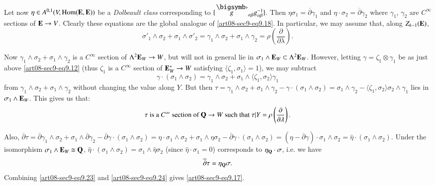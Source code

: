 Let now $\eta\in A^{0,1}(V,\operatorname{\mathrm{Hom}}(\mathbf{E},\mathbf{E}))$ be a {\em Dolbeault class} corresponding to $\{\overdot{g}_{\alpha\beta}g^{-1}_{\alpha\beta}\}$. Then $\eta\sigma_{1}=\overline{\partial}\gamma_{1}$ and $\eta\cdot \sigma_{2}=\overline{\partial}\gamma_{2}$ where $\gamma_{1}$, $\gamma_{2}$ are $C^{\infty}$ sections of $\mathbf{E}\to V$. Clearly these equations are the global analogue of \eqref{art08-sec9-eq9.18}. In particular, we may assume that, along $Z_{k-1}(\mathbf{E})$,
\begin{equation}
\sigma'_{1}\wedge \sigma_{2}+\sigma_{1}\wedge \sigma'_{2}=\gamma_{1}\wedge \sigma_{2}+\sigma_{1}\wedge \gamma_{2}=\rho\left(\dfrac{\partial}{\partial\lambda}\right).\label{art08-sec9-eq9.22}
\end{equation}\pageoriginale

Now $\gamma_{1}\wedge \sigma_{2}+\sigma_{1}\wedge\gamma_{2}$ is a $C^{\infty}$ section of $\Lambda^{2}\mathbf{E}_{W}\to W$, but will not in general lie in $\sigma_{1}\wedge \mathbf{E}_{W}\subset \Lambda^{2}\mathbf{E}_{W}$. However, letting $\gamma=\zeta_{1}\otimes \gamma_{1}$ be as just above \eqref{art08-sec9-eq9.12} (thus $\zeta_{1}$ is a $C^{\infty}$ section of $\mathbf{E}^{*}_{W}\to W$ satisfying $\langle\zeta_{1},\sigma_{1}\rangle=1$), we may subtract
$$
\gamma\cdot (\sigma_{1}\wedge\sigma_{2})=\gamma_{1}\wedge\sigma_{2}+\sigma_{1}\wedge\langle \zeta_{1},\sigma_{2}\rangle \gamma_{1}
$$
from $\gamma_{1}\wedge\sigma_{2}+\sigma_{1}\wedge\gamma_{2}$ without changing the value along $Y$. But then $\tau=\gamma_{1}\wedge\sigma_{2}+\sigma_{1}\wedge\gamma_{2}-\gamma\cdot (\sigma_{1}\wedge\sigma_{2})=\sigma_{1}\wedge\gamma_{2}-\langle \zeta_{1},\sigma_{2}\rangle\sigma_{2}\wedge\gamma_{1}$ lies in $\sigma_{1}\wedge \mathbf{E}_{W}$. This gives us that:
\begin{equation}
\tau\text{ is a $C^{\infty}$ section of } \mathbf{Q}\to W\text{ such that } \tau|Y=\rho\left(\frac{\partial}{\partial\lambda}\right).\label{art08-sec9-eq9.23}
\end{equation}

Also, $\overline{\partial}\tau=\overline{\partial}\gamma_{1}\wedge \sigma_{2}+\sigma_{1}\wedge\overline{\partial}\gamma_{2}-\overline{\partial}\gamma\cdot (\sigma_{1}\wedge\sigma_{2})= \eta\cdot \sigma_{1}\wedge\sigma_{2}+\sigma_{1}\wedge\eta\sigma_{2}-\overline{\partial}\gamma\cdot (\sigma_{1}\wedge\sigma_{2})=(\eta-\overline{\partial}\gamma)\cdot \sigma_{1}\wedge\sigma_{2}=\widehat{\eta}\cdot (\sigma_{1}\wedge\sigma_{2})$. Under the isomorphism $\sigma_{1}\wedge\mathbf{E}_{W}\cong \mathbf{Q}$, $\widehat{\eta}\cdot (\sigma_{1}\wedge\sigma_{2})=\sigma_{1}\wedge\widehat{\eta}\sigma_{2}$ (since $\widehat{\eta}\cdot \sigma_{1}=0$) corresponds to $\eta_{\mathbf{Q}}\cdot \sigma$, i.e. we have
\begin{equation}
\overline{\partial}\tau=\eta_{\mathbf{Q}}\sigma.\label{art08-sec9-eq9.24}
\end{equation}
Combining \eqref{art08-sec9-eq9.23} and \eqref{art08-sec9-eq9.24} gives \eqref{art08-sec9-eq9.17}.

